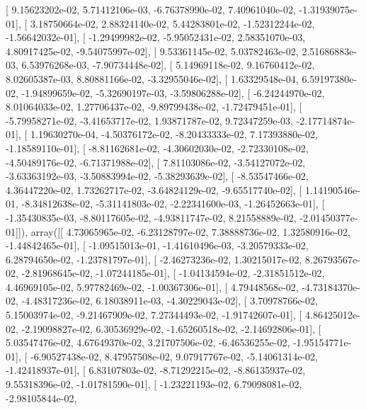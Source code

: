 \documentclass{article}
\begin{document}
       [  9.15623202e-02,   5.71412106e-03,  -6.76378990e-02,
          7.40961040e-02,  -1.31939075e-01],
       [  3.18750664e-02,   2.88324140e-02,   5.44283801e-02,
         -1.52312244e-02,  -1.56642032e-01],
       [ -1.29499982e-02,  -5.95052431e-02,   2.58351070e-03,
          4.80917425e-02,  -9.54075997e-02],
       [  9.53361145e-02,   5.03782463e-02,   2.51686883e-03,
          6.53976268e-03,  -7.90734448e-02],
       [  5.14969118e-02,   9.16760412e-02,   8.02605387e-03,
          8.80881166e-02,  -3.32955046e-02],
       [  1.63329548e-04,   6.59197380e-02,  -1.94899659e-02,
         -5.32690197e-03,  -3.59806288e-02],
       [ -6.24244970e-02,   8.01064033e-02,   1.27706437e-02,
         -9.89799438e-02,  -1.72479451e-01],
       [ -5.79958271e-02,  -3.41653717e-02,   1.93871787e-02,
          9.72347259e-03,  -2.17714874e-01],
       [  1.19630270e-04,  -4.50376172e-02,  -8.20433333e-02,
          7.17393880e-02,  -1.18589110e-01],
       [ -8.81162681e-02,  -4.30602030e-02,  -2.72330108e-02,
         -4.50489176e-02,  -6.71371988e-02],
       [  7.81103086e-02,  -3.54127072e-02,  -3.63363192e-03,
         -3.50883994e-02,  -5.38293639e-02],
       [ -8.53547466e-02,   4.36447220e-02,   1.73262717e-02,
         -3.64824129e-02,  -9.65517740e-02],
       [  1.14190546e-01,  -8.34812638e-02,  -5.31141803e-02,
         -2.22341600e-03,  -1.26452663e-01],
       [ -1.35430835e-03,  -8.80117605e-02,  -4.93811747e-02,
          8.21558889e-02,  -2.01450377e-01]]), array([[  4.73065965e-02,  -6.23128797e-02,   7.38888736e-02,
          1.32580916e-02,  -1.44842465e-01],
       [ -1.09515013e-01,  -1.41610496e-03,  -3.20579333e-02,
          6.28794650e-02,  -1.23781797e-01],
       [ -2.46273236e-02,   1.30215017e-02,   8.26793567e-02,
         -2.81968645e-02,  -1.07244185e-01],
       [ -1.04134594e-02,  -2.31851512e-02,   4.46969105e-02,
          5.97782469e-02,  -1.00367306e-01],
       [  4.79448568e-02,  -4.73184370e-02,  -4.48317236e-02,
          6.18038911e-03,  -4.30229043e-02],
       [  3.70978766e-02,   5.15003974e-02,  -9.21467909e-02,
          7.27344493e-02,  -1.91742607e-01],
       [  4.86425012e-02,  -2.19098827e-02,   6.30536929e-02,
         -1.65260518e-02,  -2.14692806e-01],
       [  5.03547476e-02,   4.67649370e-02,   3.21707506e-02,
         -6.46536255e-02,  -1.95154771e-01],
       [ -6.90527438e-02,   8.47957508e-02,   9.07917767e-02,
         -5.14061314e-02,  -1.42418937e-01],
       [  6.83107803e-02,  -8.71292215e-02,  -8.86135937e-02,
          9.55318396e-02,  -1.01781590e-01],
       [ -1.23221193e-02,   6.79098081e-02,  -2.98105844e-02,
\end{document}
